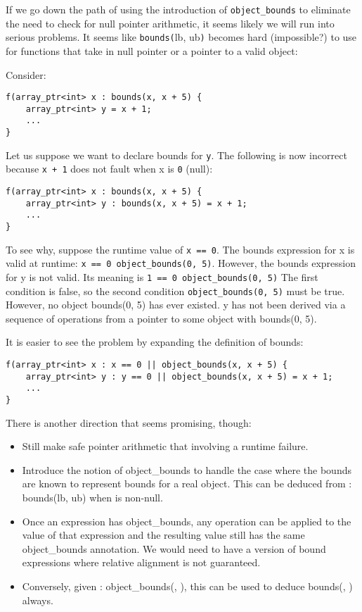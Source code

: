 If we go down the path of using the introduction of
\texttt{object\_bounds} to eliminate the need to check for null pointer
arithmetic, it seems likely we will run into serious problems. It seems
like \texttt{bounds(}lb, ub\texttt{)} becomes hard (impossible?) to use
for functions that take in null pointer or a pointer to a valid object:

Consider:
\begin{verbatim}
f(array_ptr<int> x : bounds(x, x + 5) {
    array_ptr<int> y = x + 1;
    ...
}
\end{verbatim}

Let us suppose we want to declare bounds for \texttt{y}. The following
is now incorrect because \texttt{x + 1} does not fault when x is
\texttt{0} (null):

\begin{verbatim}
f(array_ptr<int> x : bounds(x, x + 5) {
    array_ptr<int> y : bounds(x, x + 5) = x + 1;
    ...
}
\end{verbatim}

To see why, suppose the runtime value of \texttt{x == 0}. The bounds
expression for x is valid at runtime: \texttt{x == 0
\textbar{}\textbar{} object\_bounds(0, 5)}. However, the bounds
expression for y is not valid. Its meaning is \texttt{1 == 0
\textbar{}\textbar{} object\_bounds(0, 5)} The first condition is false,
so the second condition \texttt{object\_bounds(0, 5)} must be true.
However, no object bounds(0, 5) has ever existed. y has not been derived
via a sequence of operations from a pointer to some object with
bounds(0, 5).

It is easier to see the problem by expanding the definition of bounds:

\begin{verbatim}
f(array_ptr<int> x : x == 0 || object_bounds(x, x + 5) {
    array_ptr<int> y : y == 0 || object_bounds(x, x + 5) = x + 1;
    ...
}
\end{verbatim}

There is another direction that seems promising, though:

\begin{itemize}
\item
  Still make safe pointer arithmetic that involving a runtime failure.
\item
  Introduce the notion of object\_bounds to handle the case where the
  bounds are known to represent bounds for a real object. This can be
  deduced from  : bounds(lb, ub) when  is non-null.
\item
  Once an expression has object\_bounds, any operation can be applied to
  the value of that expression and the resulting value still has the
  same object\_bounds annotation. We would need to have a version of
  bound expressions where relative alignment is not guaranteed.
\item
  Conversely, given  : object\_bounds(, ),
  this can be used to deduce bounds(, ) always.
\end{itemize}

